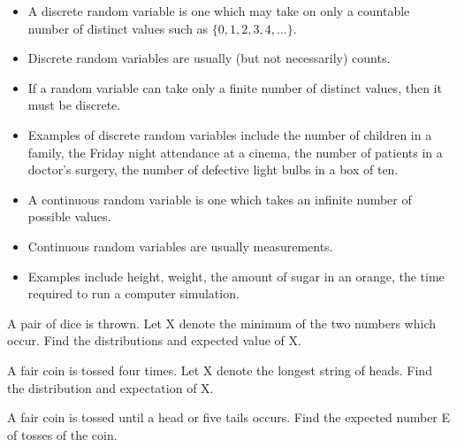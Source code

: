 \documentclass[12pt]{report}
\begin{document}
{\LARGE
	\begin{itemize}
		\item A discrete random variable is one which may take on only a countable number of distinct values such as $\{0, 1, 2, 3, 4, ... \}$.\item Discrete random variables are usually (but not necessarily) counts. \item If a random variable can take only a finite number of distinct values, then it must be discrete. \item Examples of discrete random variables include the number of children in a family, the Friday night attendance at a cinema, the number of patients in a doctor's surgery, the number of defective light bulbs in a box of ten.
	\end{itemize}
}


{\LARGE
	\begin{itemize} \item
		A continuous random variable is one which takes an infinite number of possible values. \item Continuous random variables are usually measurements. \item Examples include height, weight, the amount of sugar in an orange, the time required to run a computer simulation. \end{itemize}
	
}

		
		
		A pair of dice is thrown. Let X denote the minimum of the two numbers which occur.
		Find the distributions and expected value of X.
		
		
		
		A fair coin is tossed four times.
		Let X denote the longest string of heads.
		Find the distribution and expectation of X.
		
		
		A fair coin is tossed until a head or five tails occurs.
		Find the expected number E of tosses of the coin.
		
\end{document}
